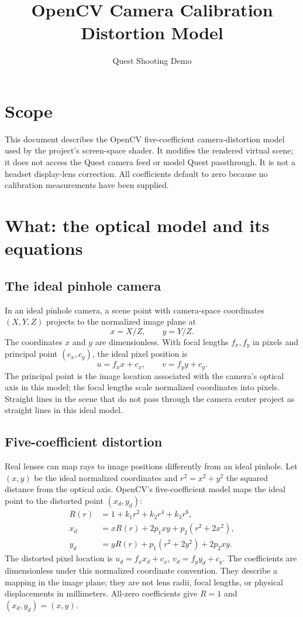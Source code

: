 \documentclass[11pt,a4paper]{article}
\title{OpenCV Camera Calibration Distortion Model}
\author{Quest Shooting Demo}
\date{}
\begin{document}
\maketitle

\section{Scope}
This document describes the OpenCV five-coefficient camera-distortion model
used by the project's screen-space shader. It modifies the rendered virtual
scene; it does not access the Quest camera feed or model Quest passthrough.
It is not a headset display-lens correction. All coefficients default to zero
because no calibration measurements have been supplied.

\section{What: the optical model and its equations}
\subsection{The ideal pinhole camera}
In an ideal pinhole camera, a scene point with camera-space coordinates
$(X,Y,Z)$ projects to the normalized image plane at
\begin{equation}
  x = X/Z, \qquad y = Y/Z.
\end{equation}
The coordinates $x$ and $y$ are dimensionless. With focal lengths $f_x,f_y$
in pixels and principal point $(c_x,c_y)$, the ideal pixel position is
\begin{equation}
  u = f_x x + c_x, \qquad v = f_y y + c_y.
\end{equation}
The principal point is the image location associated with the camera's optical
axis in this model; the focal lengths scale normalized coordinates into pixels.
Straight lines in the scene that do not pass through the camera center project
as straight lines in this ideal model.

\subsection{Five-coefficient distortion}
Real lenses can map rays to image positions differently from an ideal
pinhole. Let $(x,y)$ be the ideal normalized coordinates and
$r^2=x^2+y^2$ the squared distance from the optical axis. OpenCV's
five-coefficient model maps the ideal point to the distorted point $(x_d,y_d)$:
\begin{align}
  R(r) &= 1+k_1r^2+k_2r^4+k_3r^6,\\
  x_d &= xR(r)+2p_1xy+p_2(r^2+2x^2),\\
  y_d &= yR(r)+p_1(r^2+2y^2)+2p_2xy.
\end{align}
The distorted pixel location is $u_d=f_xx_d+c_x$,
$v_d=f_yy_d+c_y$. The coefficients are dimensionless under this normalized
coordinate convention. They describe a mapping in the image plane; they are
not lens radii, focal lengths, or physical displacements in millimeters.
All-zero coefficients give $R=1$ and $(x_d,y_d)=(x,y)$.
\end{document}
